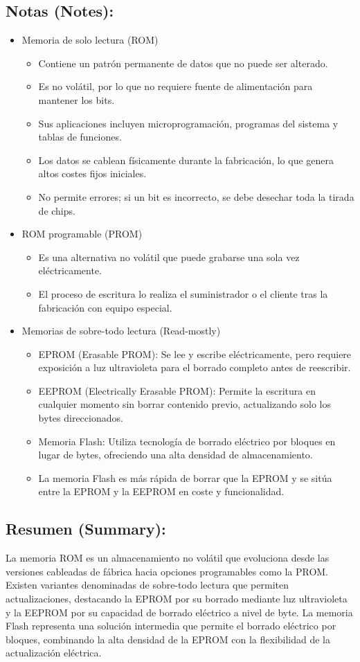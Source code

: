 \documentclass{article}
\begin{document}
\subsection{Notas (Notes):}
\label{sec:org3cb0481}
\begin{itemize}
\item Memoria de solo lectura (ROM)
\begin{itemize}
\item Contiene un patrón permanente de datos que no puede ser
alterado.
\item Es no volátil, por lo que no requiere fuente de alimentación
para mantener los bits.
\item Sus aplicaciones incluyen microprogramación, programas del
sistema y tablas de funciones.
\item Los datos se cablean físicamente durante la fabricación, lo que
genera altos costes fijos iniciales.
\item No permite errores; si un bit es incorrecto, se debe desechar
toda la tirada de chips.
\end{itemize}
\item ROM programable (PROM)
\begin{itemize}
\item Es una alternativa no volátil que puede grabarse una sola vez
eléctricamente.
\item El proceso de escritura lo realiza el suministrador o el cliente
tras la fabricación con equipo especial.
\end{itemize}
\item Memorias de sobre-todo lectura (Read-mostly)
\begin{itemize}
\item EPROM (Erasable PROM): Se lee y escribe eléctricamente, pero
requiere exposición a luz ultravioleta para el borrado completo
antes de reescribir.
\item EEPROM (Electrically Erasable PROM): Permite la escritura en
cualquier momento sin borrar contenido previo, actualizando solo
los bytes direccionados.
\item Memoria Flash: Utiliza tecnología de borrado eléctrico por
bloques en lugar de bytes, ofreciendo una alta densidad de
almacenamiento.
\item La memoria Flash es más rápida de borrar que la EPROM y se sitúa
entre la EPROM y la EEPROM en coste y funcionalidad.
\end{itemize}
\end{itemize}

\subsection{Resumen (Summary):}
\label{sec:org636b7e4}
La memoria ROM es un almacenamiento no volátil que evoluciona desde
las versiones cableadas de fábrica hacia opciones programables como la
PROM. Existen variantes denominadas de sobre-todo lectura que permiten
actualizaciones, destacando la EPROM por su borrado mediante luz
ultravioleta y la EEPROM por su capacidad de borrado eléctrico a nivel
de byte. La memoria Flash representa una solución intermedia que
permite el borrado eléctrico por bloques, combinando la alta densidad
de la EPROM con la flexibilidad de la actualización eléctrica.
\end{document}
